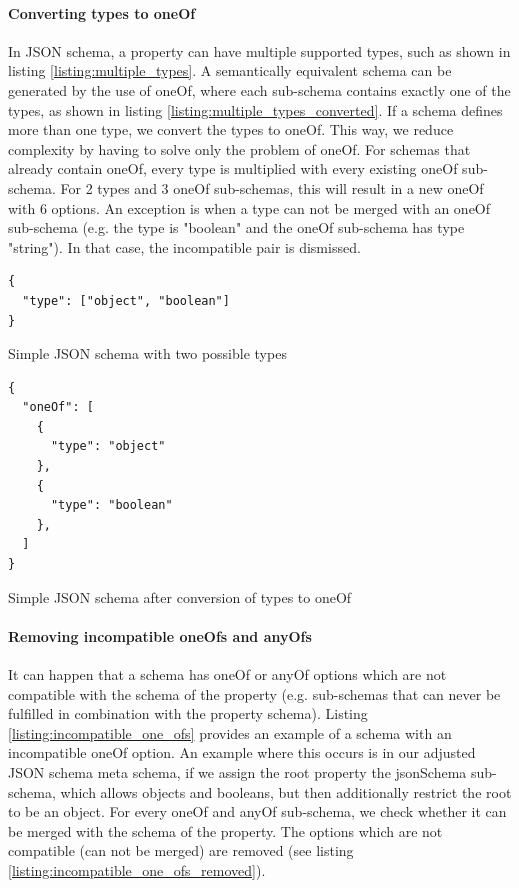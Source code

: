 \paragraph{Converting types to oneOf}
In JSON schema, a property can have multiple supported types, such as shown in listing \ref{listing:multiple_types}.
A semantically equivalent schema can be generated by the use of oneOf, where each sub-schema contains exactly one of the types, as shown in listing \ref{listing:multiple_types_converted}.
If a schema defines more than one type, we convert the types to oneOf. This way, we reduce complexity by having to solve only the problem of oneOf.
For schemas that already contain oneOf, every type is multiplied with every existing oneOf sub-schema.
For 2 types and 3 oneOf sub-schemas, this will result in a new oneOf with 6 options.
An exception is when a type can not be merged with an oneOf sub-schema (e.g. the type is "boolean" and the oneOf sub-schema has type "string").
In that case, the incompatible pair is dismissed.

\begin{listing}[!h]
    \begin{verbatim}
{
  "type": ["object", "boolean"]
}
    \end{verbatim}
    \caption{Simple JSON schema with two possible types}
    \label{listing:multiple_types}
\end{listing}

\begin{listing}[!h]
    \begin{verbatim}
{
  "oneOf": [
    {
      "type": "object"
    },
    {
      "type": "boolean"
    },
  ]
}

    \end{verbatim}

    \caption{Simple JSON schema after conversion of types to oneOf}
    \label{listing:multiple_types_converted}
\end{listing}


\paragraph{Removing incompatible oneOfs and anyOfs}
It can happen that a schema has oneOf or anyOf options which are not compatible with the schema of the property (e.g. sub-schemas that can never be fulfilled in combination with the property schema).
Listing \ref{listing:incompatible_one_ofs} provides an example of a schema with an incompatible oneOf option.
An example where this occurs is in our adjusted JSON schema meta schema, if we assign the root property the jsonSchema sub-schema, which allows objects and booleans, but then additionally restrict the root to be an object.
For every oneOf and anyOf sub-schema, we check whether it can be merged with the schema of the property.
The options which are not compatible (can not be merged) are removed (see listing \ref{listing:incompatible_one_ofs_removed}).

